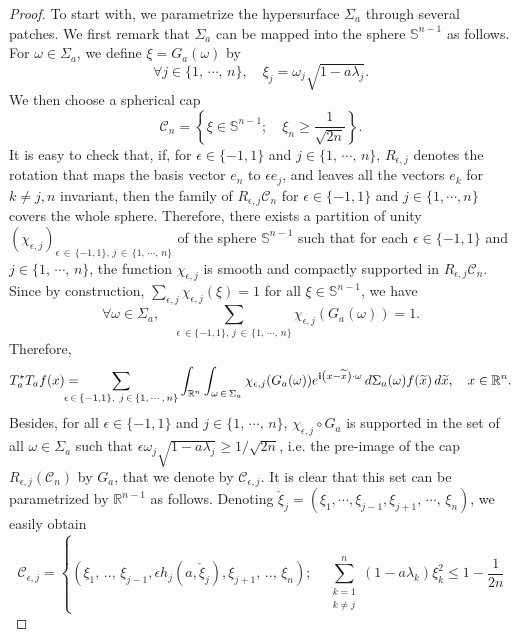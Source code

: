 \documentclass[AHL,Unicode,longabstracts]{cedram}
\newcommand{\scC}{\mathscr{C}}
\newcommand*\R{\mathbb{R}}
\renewcommand*\S{\mathbb{S}}
\renewcommand{\i}{\mathbf{i}}
\renewcommand{\leq}{\leqslant}
\renewcommand{\geq}{\geqslant}
\renewcommand{\tilde}{\widetilde}
\let\oldtilde\tilde
\renewcommand*{\tilde}[1]{\mathchoice{\widetilde{#1}}{\widetilde{#1}}{\oldtilde{#1}}{\oldtilde{#1}}}
\let\oldforall\forall
\renewcommand*{\forall}{\mathrel{\oldforall}}
\begin{document}
\begin{proof}
To start with, we parametrize the hypersurface $\Sigma_{a}$ through several patches. We first remark that $\Sigma_a$ can be mapped into the sphere $\S^{n-1}$ as follows. For $\omega \in \Sigma_a$, we define $\xi = G_a(\omega)$ by
\[
\forall j \in \{1,\,\cdots,\,n\}, \quad \xi_j = \omega_j \sqrt{1 - a \lambda_j}.
\]
We then choose a spherical cap
\[
\scC_n =
\left\{
\xi \in \S^{n-1}; \quad \xi_n \geq \frac{1}{\sqrt{2n}}
\right\}.
\]
It is easy to check that, if, for $\epsilon \in \{-1,1\}$ and $j \in \{1,\,\cdots,\,n\}$, $R_{\epsilon, j}$ denotes the rotation that maps the basis vector $e_n$ to $\epsilon e_j$, and leaves all the vectors $e_k$ for $k \neq j,n$ invariant, then the family of $R_{\epsilon,j} \scC_n$ for $\epsilon \in \{-1,1\}$ and $j \in \{1,\cdots, n\} $ covers the whole sphere. Therefore, there exists a partition of unity $(\chi_{\epsilon, j})_{\epsilon\, \in\,\{-1,1\},\,j\,\in\,\{1,\,\cdots,\, n\}}$ of the sphere $\S^{n-1}$ such that for each $\epsilon \in \{-1,1\}$ and $j \in \{1,\,\cdots,\,n\} $, the function $\chi_{\epsilon, j}$ is smooth and compactly supported in $R_{\epsilon,j} \scC_n$. Since by construction, $\sum_{\epsilon,j} \chi_{\epsilon,j} (\xi) = 1$ for all $\xi \in \S^{n-1}$, we have
\[
\forall \omega \in \Sigma_a,
\quad
\sum_{\epsilon\,\in \{-1,1\}, \, j\,\in\,\{1,\, \cdots,\,n\} } \chi_{\epsilon,j} (G_a(\omega)) = 1.
\]
Therefore,
\begin{equation*}
T^\star _{a}T_{a} f(x) =\mkern-25mu
\sum_{\epsilon\,\in\,\{-1,1\}, \ j\,\in\,\{1,\, \cdots,\,n\} }
\int_{\R^{n}}
\int_{ {\omega}\,\in\,\Sigma_{a} }
\chi_{\epsilon,j} (G_a(\omega)) e^{\i \left(x-\tilde{x}\right) \cdot {\omega}}
\, d \Sigma_{a}({\omega}) f(\tilde{x})
\, d \tilde{x},
\quad x \in \R^n.
\end{equation*}
Besides, for all $\epsilon \in \{-1,1\}$ and $j\in \{1,\,\cdots,\,n\}$, $\chi_{\epsilon,j}\circ G_a$ is supported in the set of all $\omega \in \Sigma_{a}$ such that $\epsilon \omega_{j}\sqrt{1 - a \lambda_j} \geq 1/\sqrt{2n}$, i.e. the pre-image of the cap $R_{\epsilon,j} (\scC_n)$ by $G_a$, that we denote by $\scC_{\epsilon,j}$. It is clear that this set can be parametrized by $\R^{n-1}$ as follows. Denoting $\check\xi_j = (\xi_1, \cdots, \xi_{j-1}, \xi_{j+1},\,\cdots,\,\xi_n)$, we easily obtain
\begin{equation*}
\scC_{\epsilon,j} =
\left\{
\left(\xi_1,\,..,\,\xi_{j-1}, \epsilon h_{j}\left(a, \check\xi_j\right), \xi_{j+1},\,..,\,\xi_n \right);
\quad
\sum_{\substack{k=1 \\ k \neq j}}^{n} (1-a \lambda_{k}) \xi_k^2 \leq 1- \frac{1}{2n}

\end{equation*}
\end{proof}
\end{document}
